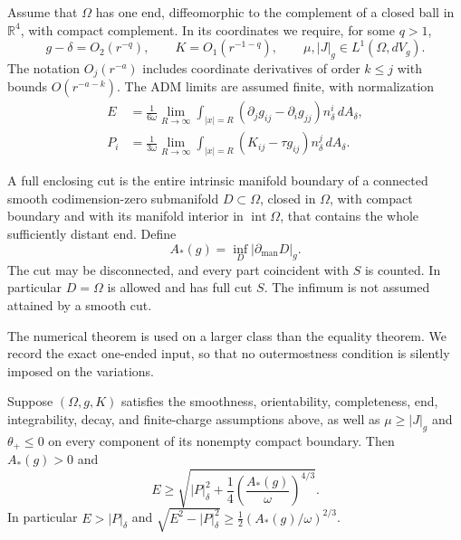Assume that $\Omega$ has one end, diffeomorphic to the complement of a
closed ball in $\mathbb R^4$, with compact complement. In its coordinates
we require, for some $q>1$,
\begin{equation}\label{q4:eq:weak-decay}
 g-\delta=O_2(r^{-q}),\qquad K=O_1(r^{-1-q}),
 \qquad \mu,|J|_g\in L^1(\Omega,dV_g).
\end{equation}
The notation $O_j(r^{-a})$ includes coordinate derivatives of order
$k\le j$ with bounds $O(r^{-a-k})$. The ADM limits are assumed finite,
with normalization
\begin{align}
 E&=\frac1{6\omega}\lim_{R\to\infty}
 \int_{|x|=R}(\partial_jg_{ij}-\partial_i g_{jj})
              n_\delta^i\,dA_\delta,\label{q4:intro:energy}\\
 P_i&=\frac1{3\omega}\lim_{R\to\infty}
 \int_{|x|=R}(K_{ij}-\tau g_{ij})n_\delta^j\,dA_\delta.
 \label{q4:intro:momentum}
\end{align}

\begin{definition}\label{q4:def:cuts}
A full enclosing cut is the entire intrinsic manifold boundary of a
connected smooth codimension-zero submanifold $D\subset\Omega$, closed
in $\Omega$, with compact boundary and with its manifold interior in
$\operatorname{int}\Omega$, that contains the whole sufficiently distant
end. Define
\[
 A_*(g)=\inf_D|\partial_{\mathrm{man}}D|_g.
\]
The cut may be disconnected, and every part coincident with $S$ is
counted. In particular $D=\Omega$ is allowed and has full cut $S$.
The infimum is not assumed attained by a smooth cut.
\end{definition}

The numerical theorem is used on a larger class than the equality theorem.
We record the exact one-ended input, so that no outermostness condition is
silently imposed on the variations.

\begin{theorem}
\label{q4:thm:numerical-provider}
Suppose $(\Omega,g,K)$ satisfies the smoothness, orientability,
completeness, end, integrability, decay, and finite-charge assumptions
above, as well as $\mu\ge|J|_g$ and $\theta_+\le0$ on every component
of its nonempty compact boundary. Then $A_*(g)>0$ and
\begin{equation}\label{q4:eq:numerical}
 E\ge\sqrt{|P|_\delta^2+\frac14
                    \left(\frac{A_*(g)}\omega\right)^{4/3}}.
\end{equation}
In particular $E>|P|_\delta$ and
$\sqrt{E^2-|P|_\delta^2}\ge\frac12(A_*(g)/\omega)^{2/3}$.
\end{theorem}

